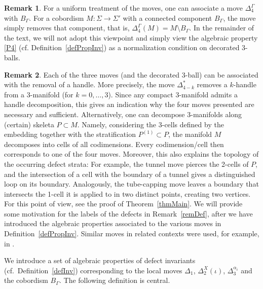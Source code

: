 \documentclass[10pt,a4paper]{amsart}
\numberwithin{equation}{section}
\theoremstyle{definition}
\newtheorem{Remark}[Remark]{Remark}
\begin{document}
\begin{Remark}
 For a uniform treatment of the moves, one can associate a move $\Delta_4^{\Gamma}$ with $B_{\Gamma}$. For a cobordism $M\colon \Sigma \rightarrow \Sigma'$ with a connected component $B_{\Gamma}$, the move simply removes that component, that is, $\Delta_4^{\Gamma}(M) = M \setminus B_{\Gamma}$. In the remainder of the text, we will not adopt this viewpoint and simply view the algebraic property \ref{P4} (cf. Definition~\ref{defPropInv}) as a normalization condition on decorated 3-balls.
\end{Remark}
\begin{Remark}
 Each of the three moves (and the decorated 3-ball) can be associated with the removal of a handle. More precisely, the move $\Delta_{4-k}^*$ removes a $k$-handle from a 3-manifold (for $k = 0, \dots, 3$). Since any compact 3-manifold admits a handle decomposition, this gives an indication why the four moves presented are necessary and sufficient. Alternatively, one can decompose 3-manifolds along (certain) skeleta $P \subset M$. Namely, considering the 3-cells defined by the embedding together with the stratification $P^{(1)} \subset P$, the manifold $M$ decomposes into cells of all codimensions. Every codimension/cell then corresponds to one of the four moves. Moreover, this also explains the topology of the occurring defect strata: For example, the tunnel move pierces the 2-cells of $P$, and the intersection of a cell with the boundary of a tunnel gives a distinguished loop on its boundary. Analogously, the tube-capping move leaves a boundary that intersects the 1-cell it is applied to in two distinct points, creating two vertices. For this point of view, see the proof of Theorem~\ref{thmMain}. We will provide some motivation for the labels of the defects in Remark~\ref{remDef}, after we have introduced the algebraic properties associated to the various moves in Definition~\ref{defPropInv}. Similar moves in related contexts were used, for example, in \cite{CGPT, LMWW, LMWW2, W}.
\end{Remark}
We introduce a set of algebraic properties of defect invariants (cf.\ Definition~\ref{defInv}) corresponding to the local moves $\Delta_1$, $\Delta_2^X(\iota)$, $\Delta_3^{\alpha_i}$ and the cobordism $B_{\Gamma}$. The following definition is central.
\end{document}
